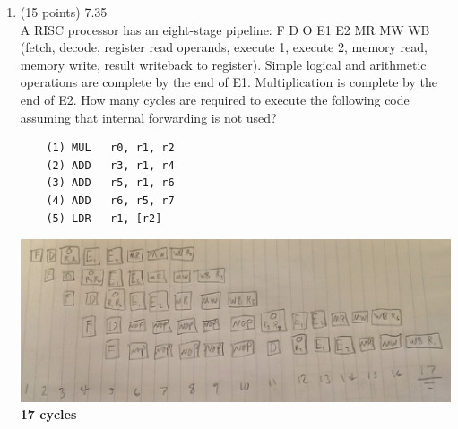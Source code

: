 \documentclass[letterpaper,10pt,onecolumn,titlepage]{article}
\begin{document}
\begin{enumerate}
\item (15 points) 7.35 \\
	A RISC processor has an eight-stage pipeline: F D O E1 E2 MR MW WB (fetch, decode,
	register read operands, execute 1, execute 2, memory read, memory write, result
	writeback to register). Simple logical and arithmetic operations are complete by
	the end of E1. Multiplication is complete by the end of E2. How many cycles are
	required to execute the following code assuming that internal forwarding is not
	used?
	\begin{verbatim}
	(1) MUL   r0, r1, r2
	(2) ADD   r3, r1, r4
	(3) ADD   r5, r1, r6
	(4) ADD   r6, r5, r7
	(5) LDR   r1, [r2]
	\end{verbatim}
	\includegraphics[width=5in]{images/7_35.eps} \\
	{\Large{\textbf{17 cycles}}}


\end{enumerate}
\end{document}
